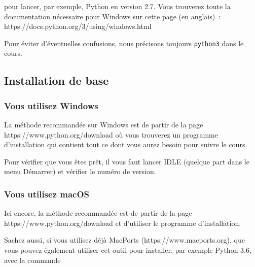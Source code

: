 \begin{Shaded}
\begin{Highlighting}[frame=lines,framerule=0.6mm,rulecolor=\color{asisframecolor}]
\NormalTok{:}\DataTypeTok{\textbackslash{}>}
\end{Highlighting}
\end{Shaded}

pour lancer, par exemple, Python en version 2.7. Vous trouverez toute la
documentation nécessaire pour Windows sur cette page (en anglais)~:
https://docs.python.org/3/using/windows.html

Pour éviter d'éventuelles confusions, nous précisons toujours
\texttt{python3} dans le cours.

    \hypertarget{installation-de-base}{%
\subsection{Installation de base}\label{installation-de-base}}

    \hypertarget{vous-utilisez-windows}{%
\subsubsection{Vous utilisez Windows}\label{vous-utilisez-windows}}

    La méthode recommandée sur Windows est de partir de la page
https://www.python.org/download où vous trouverez un programme
d'installation qui contient tout ce dont vous aurez besoin pour suivre
le cours.

Pour vérifier que vous êtes prêt, il vous faut lancer IDLE (quelque part
dans le menu Démarrer) et vérifier le numéro de version.

    \hypertarget{vous-utilisez-macos}{%
\subsubsection{Vous utilisez macOS}\label{vous-utilisez-macos}}

    Ici encore, la méthode recommandée est de partir de la page
https://www.python.org/download et d'utiliser le programme
d'installation.

Sachez aussi, si vous utilisez déjà MacPorts (https://www.macports.org),
que vous pouvez également utiliser cet outil pour installer, par exemple
Python 3.6, avec la commande

    \begin{Shaded}
\begin{Highlighting}[frame=lines,framerule=0.6mm,rulecolor=\color{asisframecolor}]
\NormalTok{$ }
\end{Highlighting}
\end{Shaded}


